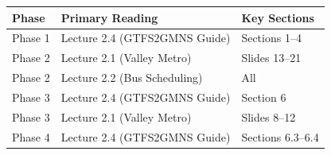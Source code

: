 \documentclass[11pt,letterpaper]{article}
\begin{document}
\begin{center}
\begin{tabular}{lll}
\toprule
\textbf{Phase} & \textbf{Primary Reading} & \textbf{Key Sections} \\
\midrule
Phase 1 & Lecture 2.4 (GTFS2GMNS Guide) & Sections 1--4 \\
Phase 2 & Lecture 2.1 (Valley Metro) & Slides 13--21 \\
Phase 2 & Lecture 2.2 (Bus Scheduling) & All \\
Phase 3 & Lecture 2.4 (GTFS2GMNS Guide) & Section 6 \\
Phase 3 & Lecture 2.1 (Valley Metro) & Slides 8--12 \\
Phase 4 & Lecture 2.4 (GTFS2GMNS Guide) & Sections 6.3--6.4 \\
\bottomrule
\end{tabular}
\end{center}
\end{document}
